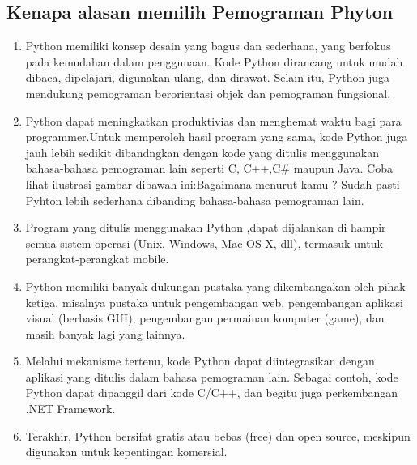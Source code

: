 \subsection{Kenapa alasan memilih Pemograman Phyton}
\begin{enumerate}
\item Python memiliki konsep desain yang bagus dan sederhana, yang berfokus pada kemudahan dalam penggunaan. Kode Python dirancang untuk mudah dibaca, dipelajari, digunakan ulang, dan dirawat. Selain itu, Python juga mendukung pemograman berorientasi objek dan pemograman fungsional.
\item Python dapat meningkatkan produktivias dan menghemat waktu bagi para programmer.Untuk memperoleh hasil program yang sama, kode Python juga jauh lebih sedikit dibandngkan dengan kode yang ditulis menggunakan bahasa-bahasa pemograman lain seperti C, C++,C\# maupun Java. Coba lihat ilustrasi gambar dibawah ini:Bagaimana menurut kamu ? Sudah pasti Pyhton lebih sederhana dibanding bahasa-bahasa pemograman lain.
\item Program yang ditulis menggunakan Python ,dapat dijalankan di hampir semua sistem operasi (Unix, Windows, Mac OS X, dll), termasuk untuk perangkat-perangkat mobile.
\item Python memiliki banyak dukungan pustaka yang dikembangakan oleh pihak ketiga, misalnya pustaka untuk pengembangan web, pengembangan aplikasi visual (berbasis GUI), pengembangan permainan komputer (game), dan masih banyak lagi yang lainnya.
\item Melalui mekanisme tertenu, kode Python dapat diintegrasikan dengan aplikasi yang ditulis dalam bahasa pemograman lain. Sebagai contoh, kode Python dapat dipanggil dari kode C/C++, dan begitu juga perkembangan .NET Framework.
\item Terakhir, Python bersifat gratis atau bebas (free) dan open source, meskipun digunakan untuk kepentingan komersial.
\end{enumerate}

